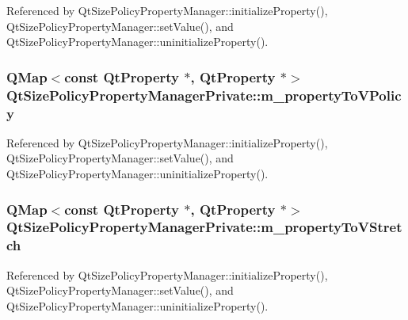 Referenced by Qt\+Size\+Policy\+Property\+Manager\+::initialize\+Property(), Qt\+Size\+Policy\+Property\+Manager\+::set\+Value(), and Qt\+Size\+Policy\+Property\+Manager\+::uninitialize\+Property().

\subsubsection[{m\+\_\+property\+To\+V\+Policy}]{\setlength{\rightskip}{0pt plus 5cm}Q\+Map$<$const {\bf Qt\+Property} $\ast$, {\bf Qt\+Property} $\ast$$>$ Qt\+Size\+Policy\+Property\+Manager\+Private\+::m\+\_\+property\+To\+V\+Policy}\label{classQtSizePolicyPropertyManagerPrivate_ab45de6e54adfe31f061cfe183caf99b0}


Referenced by Qt\+Size\+Policy\+Property\+Manager\+::initialize\+Property(), Qt\+Size\+Policy\+Property\+Manager\+::set\+Value(), and Qt\+Size\+Policy\+Property\+Manager\+::uninitialize\+Property().

\subsubsection[{m\+\_\+property\+To\+V\+Stretch}]{\setlength{\rightskip}{0pt plus 5cm}Q\+Map$<$const {\bf Qt\+Property} $\ast$, {\bf Qt\+Property} $\ast$$>$ Qt\+Size\+Policy\+Property\+Manager\+Private\+::m\+\_\+property\+To\+V\+Stretch}\label{classQtSizePolicyPropertyManagerPrivate_a9bdf9be9d45bc41bc7461359e26aa60d}


Referenced by Qt\+Size\+Policy\+Property\+Manager\+::initialize\+Property(), Qt\+Size\+Policy\+Property\+Manager\+::set\+Value(), and Qt\+Size\+Policy\+Property\+Manager\+::uninitialize\+Property().

